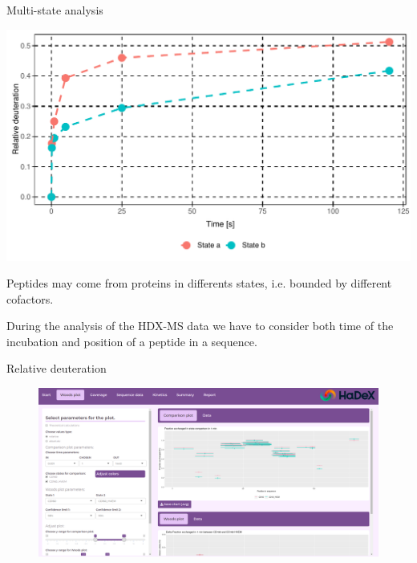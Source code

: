\documentclass{beamer}\usepackage[]{graphicx}\usepackage[]{color}
\makeatletter
\def\maxwidth{ %
  \ifdim\Gin@nat@width>\linewidth
    \linewidth
  \else
    \Gin@nat@width
  \fi
}
\newenvironment{knitrout}{}{} %
\makeatother
\begin{document}
\begin{frame}{Multi-state analysis}

\begin{knitrout}
\color{fgcolor}
\includegraphics[width=\maxwidth]{figure/unnamed-chunk-1-1} 

\end{knitrout}


Peptides may come from proteins in differents states, i.e. bounded by different cofactors.

\end{frame}


\begin{frame}

\begin{center}
\end{center}

During the analysis of the HDX-MS data we have to consider both time of the incubation and position of a peptide in a sequence. 
\end{frame}


\begin{frame}{Relative deuteration}
\begin{figure} 
\includegraphics[width=\textwidth]{static_figure/HaDeX-2.png}
\end{figure}
\end{frame}
\end{document}
